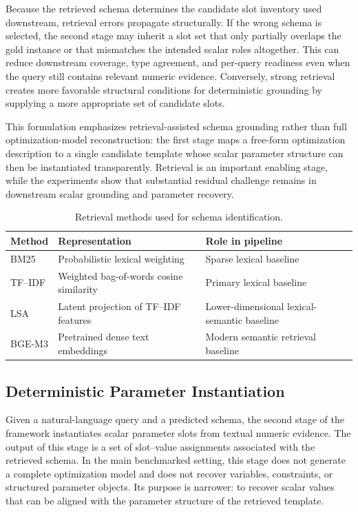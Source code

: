 \documentclass[pdflatex,sn-basic,Numbered]{sn-jnl}
\begin{document}
Because the retrieved schema determines the candidate slot inventory used downstream, retrieval errors propagate structurally. If the wrong schema is selected, the second stage may inherit a slot set that only partially overlaps the gold instance or that mismatches the intended scalar roles altogether. This can reduce downstream coverage, type agreement, and per-query readiness even when the query still contains relevant numeric evidence. Conversely, strong retrieval creates more favorable structural conditions for deterministic grounding by supplying a more appropriate set of candidate slots.

This formulation emphasizes retrieval-assisted schema grounding rather than full optimization-model reconstruction: the first stage maps a free-form optimization description to a single candidate template whose scalar parameter structure can then be instantiated transparently. Retrieval is an important enabling stage, while the experiments show that substantial residual challenge remains in downstream scalar grounding and parameter recovery.

\begin{table}[t]
\centering
\caption{Retrieval methods used for schema identification.}
\label{tab:retrieval_backbones}
\small
\begin{tabularx}{\linewidth}{l l X}
\toprule
Method & Representation & Role in pipeline \\
\midrule
BM25 & Probabilistic lexical weighting & Sparse lexical baseline \\
TF--IDF & Weighted bag-of-words cosine similarity & Primary lexical baseline \\
LSA & Latent projection of TF--IDF features & Lower-dimensional lexical-semantic baseline \\
BGE-M3 & Pretrained dense text embeddings & Modern semantic retrieval baseline \\
\bottomrule
\end{tabularx}
\end{table}

\subsection{Deterministic Parameter Instantiation}
\label{subsec:method_instantiation}

Given a natural-language query and a predicted schema, the second stage of the framework instantiates scalar parameter slots from textual numeric evidence. The output of this stage is a set of slot--value assignments associated with the retrieved schema. In the main benchmarked setting, this stage does not generate a complete optimization model and does not recover variables, constraints, or structured parameter objects. Its purpose is narrower: to recover scalar values that can be aligned with the parameter structure of the retrieved template.
\end{document}

